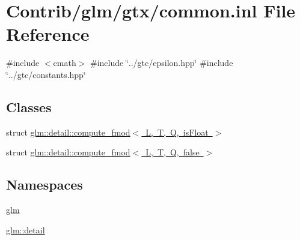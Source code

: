 \hypertarget{common_8inl}{}\section{Contrib/glm/gtx/common.inl File Reference}
\label{common_8inl}
{\ttfamily \#include $<$cmath$>$}\newline
{\ttfamily \#include \char`\"{}../gtc/epsilon.\+hpp\char`\"{}}\newline
{\ttfamily \#include \char`\"{}../gtc/constants.\+hpp\char`\"{}}\newline
\subsection*{Classes}
\begin{DoxyCompactItemize}
\item 
struct \mbox{\hyperlink{structglm_1_1detail_1_1compute__fmod}{glm\+::detail\+::compute\+\_\+fmod$<$ L, T, Q, is\+Float $>$}}
\item 
struct \mbox{\hyperlink{structglm_1_1detail_1_1compute__fmod_3_01_l_00_01_t_00_01_q_00_01false_01_4}{glm\+::detail\+::compute\+\_\+fmod$<$ L, T, Q, false $>$}}
\end{DoxyCompactItemize}
\subsection*{Namespaces}
\begin{DoxyCompactItemize}
\item 
 \mbox{\hyperlink{namespaceglm}{glm}}
\item 
 \mbox{\hyperlink{namespaceglm_1_1detail}{glm\+::detail}}
\end{DoxyCompactItemize}
